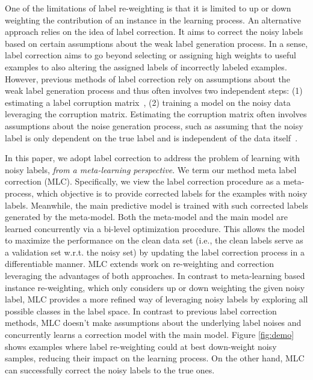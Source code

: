 One of the limitations of label re-weighting is that it is limited to up or down weighting the contribution of an instance in the learning process. An alternative approach relies on the idea of label correction. It aims to correct the noisy labels based on certain assumptions about the weak label generation process. In a sense, label correction aims to go beyond selecting or assigning high weights to useful examples to also altering the assigned labels of incorrectly labeled examples. 
However, previous methods of label correction rely on assumptions about the weak label generation process
and thus often involves two independent steps:  (1) estimating a label corruption
matrix~\cite{hendrycks2018using}, (2) training a model on the noisy data leveraging the corruption matrix. Estimating the corruption matrix often involves assumptions about the noise generation process, such as assuming that the noisy label is only dependent on the true label and is independent of the data itself~\cite{hendrycks2018using}.


In this paper, we adopt label correction to address the problem of
learning with noisy labels, \textit{from a meta-learning
  perspective}. We term our method meta label correction
(MLC). Specifically, we view the label correction procedure as a
meta-process, which objective is to provide corrected
labels for the examples with noisy labels. Meanwhile, the main
predictive model is trained with such corrected
labels generated by the meta-model. Both the meta-model and the main
model are learned concurrently via a bi-level optimization procedure. This allows the model to maximize the performance on the
clean data set (i.e., the clean labels serve as a validation set
w.r.t. the noisy set) by updating the label correction process in a
differentiable manner. MLC extends work on re-weighting and correction
leveraging the advantages of both approaches. In contrast to
meta-learning based instance re-weighting, which only considers up or
down weighting the given noisy label,
MLC provides a more refined way of leveraging noisy
labels by exploring all possible classes in the label space. In
contrast to previous label correction methods, MLC doesn't make
assumptions about the underlying label noises and concurrently learns
a correction model with the main model. Figure \ref{fig:demo} shows
examples where label re-weighting could at best down-weight noisy
samples, reducing their impact on the learning process. On the other
hand, MLC can successfully correct the noisy labels to the true ones.

